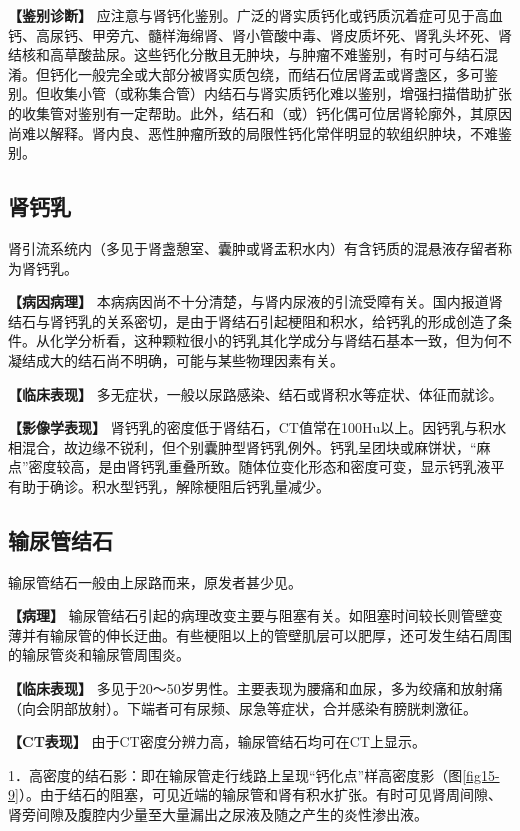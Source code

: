 \textbf{【鉴别诊断】}
应注意与肾钙化鉴别。广泛的肾实质钙化或钙质沉着症可见于高血钙、高尿钙、甲旁亢、髓样海绵肾、肾小管酸中毒、肾皮质坏死、肾乳头坏死、肾结核和高草酸盐尿。这些钙化分散且无肿块，与肿瘤不难鉴别，有时可与结石混淆。但钙化一般完全或大部分被肾实质包绕，而结石位居肾盂或肾盏区，多可鉴别。但收集小管（或称集合管）内结石与肾实质钙化难以鉴别，增强扫描借助扩张的收集管对鉴别有一定帮助。此外，结石和（或）钙化偶可位居肾轮廓外，其原因尚难以解释。肾内良、恶性肿瘤所致的局限性钙化常伴明显的软组织肿块，不难鉴别。

\subsection{肾钙乳}

肾引流系统内（多见于肾盏憩室、囊肿或肾盂积水内）有含钙质的混悬液存留者称为肾钙乳。

\textbf{【病因病理】}
本病病因尚不十分清楚，与肾内尿液的引流受障有关。国内报道肾结石与肾钙乳的关系密切，是由于肾结石引起梗阻和积水，给钙乳的形成创造了条件。从化学分析看，这种颗粒很小的钙乳其化学成分与肾结石基本一致，但为何不凝结成大的结石尚不明确，可能与某些物理因素有关。

\textbf{【临床表现】}
多无症状，一般以尿路感染、结石或肾积水等症状、体征而就诊。

\textbf{【影像学表现】}
肾钙乳的密度低于肾结石，CT值常在100Hu以上。因钙乳与积水相混合，故边缘不锐利，但个别囊肿型肾钙乳例外。钙乳呈团块或麻饼状，“麻点”密度较高，是由肾钙乳重叠所致。随体位变化形态和密度可变，显示钙乳液平有助于确诊。积水型钙乳，解除梗阻后钙乳量减少。

\subsection{输尿管结石}

输尿管结石一般由上尿路而来，原发者甚少见。

\textbf{【病理】}
输尿管结石引起的病理改变主要与阻塞有关。如阻塞时间较长则管壁变薄并有输尿管的伸长迂曲。有些梗阻以上的管壁肌层可以肥厚，还可发生结石周围的输尿管炎和输尿管周围炎。

\textbf{【临床表现】}
多见于20～50岁男性。主要表现为腰痛和血尿，多为绞痛和放射痛（向会阴部放射）。下端者可有尿频、尿急等症状，合并感染有膀胱刺激征。

\textbf{【CT表现】} 由于CT密度分辨力高，输尿管结石均可在CT上显示。

1．高密度的结石影：即在输尿管走行线路上呈现“钙化点”样高密度影（图\ref{fig15-9}）。由于结石的阻塞，可见近端的输尿管和肾有积水扩张。有时可见肾周间隙、肾旁间隙及腹腔内少量至大量漏出之尿液及随之产生的炎性渗出液。

